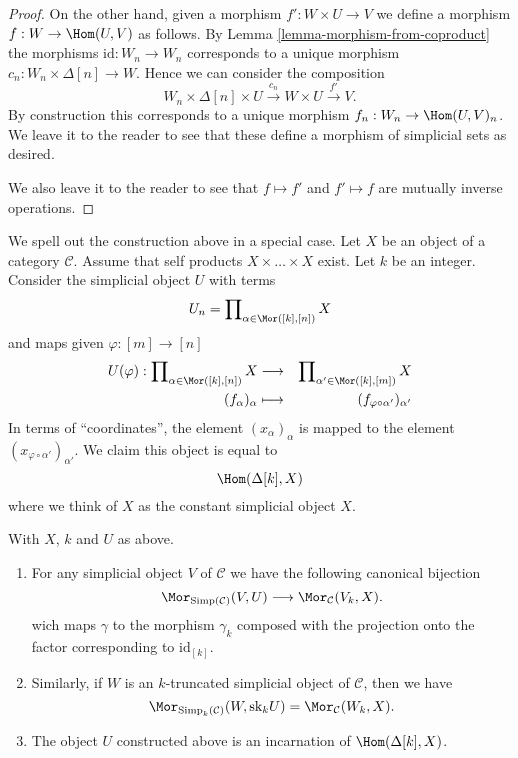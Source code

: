 \begin{proof}
\medskip\noindent
On the other hand, given a morphism
$f' : W \times U \to V$ we define
a morphism $f : W \to \Hom(U, V)$
as follows. By Lemma \ref{lemma-morphism-from-coproduct} the morphisms
$\text{id} : W_n \to W_n$ corresponds to a unique
morphism $c_n : W_n \times \Delta[n] \to W$.
Hence we can consider the composition
$$
W_n \times \Delta[n] \times U
\xrightarrow{c_n}
W \times U
\xrightarrow{f'}
V.
$$
By construction this corresponds to a unique morphism
$f_n : W_n \to \Hom(U, V)_n$. We leave it to the reader
to see that these define a morphism of simplicial sets as
desired.

\medskip\noindent
We also leave it to the reader to see that
$f \mapsto f'$ and $f' \mapsto f$ are mutually inverse
operations.
\end{proof}

\noindent
We spell out the construction above in a special case.
Let $X$ be an object of a category $\mathcal{C}$.
Assume that self products $X \times \ldots \times X$ exist.
Let $k$ be an integer.
Consider the simplicial object $U$ with terms
$$
U_n = \prod\nolimits_{\alpha \in \Mor([k], [n])} X
$$
and maps given $\varphi : [m] \to [n]$
\begin{eqnarray*}
U(\varphi) :
\prod\nolimits_{\alpha \in \Mor([k], [n])} X
& \longrightarrow &
\prod\nolimits_{\alpha' \in \Mor([k], [m])} X \\
(f_{\alpha})_{\alpha} & \longmapsto &
(f_{\varphi \circ \alpha'})_{\alpha'}
\end{eqnarray*}
In terms of ``coordinates'', the element $(x_\alpha)_\alpha$
is mapped to the element $(x_{\varphi \circ \alpha'})_{\alpha'}$.
We claim this object is equal to
$$
\Hom(\Delta[k], X)
$$
where we think of $X$ as the constant simplicial object $X$.

\begin{lemma}
\label{lemma-morphism-into-product}
With $X$, $k$ and $U$ as above.
\begin{enumerate}
\item For any simplicial object $V$ of
$\mathcal{C}$ we have the following
canonical bijection
$$
\Mor_{\text{Simp}(\mathcal{C})}(V, U)
\longrightarrow
\Mor_\mathcal{C}(V_k, X).
$$
wich maps $\gamma$ to the morphism $\gamma_k$ composed with
the projection onto the factor corresponding to $\text{id}_{[k]}$.
\item Similarly, if $W$ is an $k$-truncated simplicial object
of $\mathcal{C}$, then we have
$$
\Mor_{\text{Simp}_k(\mathcal{C})}(W, \text{sk}_k U)
=
\Mor_\mathcal{C}(W_k, X).
$$
\item The object $U$ constructed above is an
incarnation of $\Hom(\Delta[k], X)$.
\end{enumerate}
\end{lemma}

